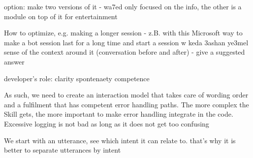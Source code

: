 option: make two versions of it - wa7ed only focused on the info, the other is a module on top of it for entertainment

How to optimize, e.g. making a longer session
- z.B. with this Microsoft way to make a bot session last for a long time and start a session w keda 3ashan ye3mel sense of the context around it (conversation before and after)
- give a suggested answer



developer’s role:
clarity
spontenaety
competence

As such, we need to create an interaction model that takes care of wording order and a fulfilment that has competent error handling paths. The more complex the Skill gets, the more important to make error handling integrate in the code. Excessive logging is not bad as long as it does not get too confusing


We start with an utterance, see which intent it can relate to.  that's why it is better to separate utterances by intent








